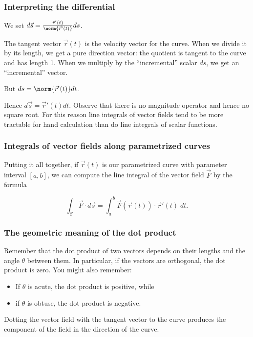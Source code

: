 \documentclass[11pt,ignorenonframetext,aspectratio=169,xcolor={svgnames}]{beamer}
\begin{document}
\begin{frame}\frametitle{Interpreting the differential}

We set $d\vec{s} = \frac{\vec{r}'(t)}{\norm{\vec{r}'(t)}} ds$.

The tangent vector $\vec{r}(t)$ is the velocity vector for the curve.
When we divide it by its length, we get a pure direction vector: the
quotient is tangent to the curve and has length 1. When we multiply by
the ``incremental'' scalar $ds$, we get an ``incremental'' vector.

But $ds = \norm{\vec{r}'(t)} dt$.

Hence $d\vec{s} = \vec{r}'(t) dt$. Observe that there is no magnitude
operator and hence no square root. For this reason line integrals of
vector fields tend to be more tractable for hand calculation than do
line integrals of scalar functions.

\end{frame}

\begin{frame}\frametitle{Integrals of vector fields along parametrized
curves}

Putting it all together, if $\vec{r}(t)$ is our parametrized curve with
parameter interval $[a,b]$, we can compute the line integral of the
vector field $\vec{F}$ by the formula

\begin{equation*}
    \int_{\mathcal{C}} \vec{F} \cdot d\vec{s} = \int_{a}^b \vec{F}(\vec{r}(t)) \cdot \vec{r}'(t) \; dt.
\end{equation*}

\end{frame}

\begin{frame}\frametitle{The geometric meaning of the dot product}

Remember that the dot product of two vectors depends on their lengths
and the angle $\theta$ between them. In particular, if the vectors are
orthogonal, the dot product is zero. You might also remember:

\begin{itemize}
\itemsep1pt\parskip0pt
\item
  If $\theta$ is acute, the dot product is positive, while
\item
  if $\theta$ is obtuse, the dot product is negative.
\end{itemize}

Dotting the vector field with the tangent vector to the curve produces
the component of the field in the direction of the curve.

\end{frame}
\end{document}
